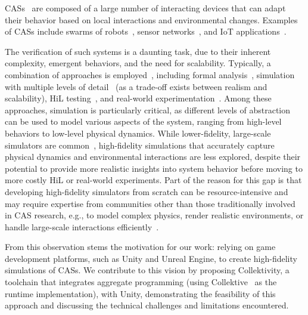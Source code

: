 \acp{CAS}~\cite{DBLP:conf/birthday/BucchiaroneM19} are composed of a large number of interacting devices that can adapt their behavior based on local interactions and environmental changes.
%
Examples of \acp{CAS} include swarms of robots~\cite{DBLP:conf/acsos/AguzziBCMPPV25},
sensor networks~\cite{DBLP:conf/mobicom/MainwaringCPSA02,DBLP:journals/tosn/IngelrestBSVCP10},
and \ac{IoT} applications~\cite{DBLP:journals/internet/AguzziCPV22}.

The verification of such systems is a daunting task,
due to their inherent complexity, emergent behaviors, and the need for scalability.
%
Typically, a combination of approaches is employed~\cite{Abeywickrama2025,DBLP:journals/ras/DixonWFZ12},
including formal analysis~\cite{DBLP:journals/ras/KonurDF12},
simulation with multiple levels of detail~\cite{PianiniJOS2013,DBLP:journals/swarm/PinciroliTOPBBMFCDBGD12,DBLP:journals/jirs/PlattR22}
(as a trade-off exists between realism and scalability),
\ac{HiL} testing~\cite{Sende2024},
and real-world experimentation~\cite{DBLP:journals/scirobotics/ZhouWWGLWYLCXG22,Werfel2014}.
%
Among these approaches,
simulation is particularly critical,
as different levels of abstraction can be used to model various aspects of the system,
ranging from high-level behaviors to low-level physical dynamics.
%
While lower-fidelity, large-scale simulators are common~\cite{DBLP:journals/computation/Calderon-ArceBS22},
high-fidelity simulations that accurately capture physical dynamics and environmental interactions are less explored,
despite their potential to provide more realistic insights into system behavior
before moving to more costly \ac{HiL} or real-world experiments.
%
Part of the reason for this gap is that developing high-fidelity simulators from scratch can be resource-intensive
and may require expertise from communities other than those traditionally involved in \ac{CAS} research,
e.g., to model complex physics, render realistic environments, or handle large-scale interactions efficiently~\cite{Wolf2020,DBLP:conf/fsr/ShahDLK17}.

From this observation stems the motivation for our work:
relying on game development platforms, such as Unity and Unreal Engine, to create high-fidelity simulations of \acp{CAS}.
%
We contribute to this vision by proposing Collektivity,
a toolchain that integrates aggregate programming
(using Collektive~\cite{DBLP:conf/acsos/Cortecchia24} as the runtime implementation),
with Unity,
demonstrating the feasibility of this approach and discussing the technical challenges and limitations encountered.

